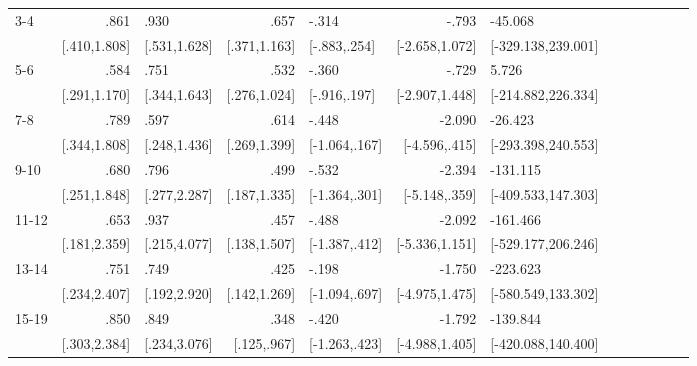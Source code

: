 \begin{table}[h]
\begin{adjustbox}{max width=\linewidth}
\begin{threeparttable}
{\begin{tabular}{l*{6}{D{.}{.}{-1}l}}
3-4             &            .861&            .930&            .657&           -.314&           -.793&         -45.068\\
                &    [.410,1.808]&    [.531,1.628]&    [.371,1.163]&    [-.883,.254]&  [-2.658,1.072]&[-329.138,239.001]\\

5-6             &            .584&            .751&            .532&           -.360&           -.729&           5.726\\
                &    [.291,1.170]&    [.344,1.643]&    [.276,1.024]&    [-.916,.197]&  [-2.907,1.448]&[-214.882,226.334]\\

7-8             &            .789&            .597&            .614&           -.448&          -2.090&         -26.423\\
                &    [.344,1.808]&    [.248,1.436]&    [.269,1.399]&   [-1.064,.167]&   [-4.596,.415]&[-293.398,240.553]\\

9-10            &            .680&            .796&            .499&           -.532&          -2.394&        -131.115\\
                &    [.251,1.848]&    [.277,2.287]&    [.187,1.335]&   [-1.364,.301]&   [-5.148,.359]&[-409.533,147.303]\\

11-12           &            .653&            .937&            .457&           -.488&          -2.092&        -161.466\\
                &    [.181,2.359]&    [.215,4.077]&    [.138,1.507]&   [-1.387,.412]&  [-5.336,1.151]&[-529.177,206.246]\\

13-14           &            .751&            .749&            .425&           -.198&          -1.750&        -223.623\\
                &    [.234,2.407]&    [.192,2.920]&    [.142,1.269]&   [-1.094,.697]&  [-4.975,1.475]&[-580.549,133.302]\\

15-19           &            .850&            .849&            .348&           -.420&          -1.792&        -139.844\\
                &    [.303,2.384]&    [.234,3.076]&     [.125,.967]&   [-1.263,.423]&  [-4.988,1.405]&[-420.088,140.400]\\


\end{tabular}}
\end{threeparttable}
\end{adjustbox}
\end{table}
